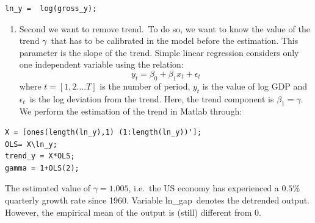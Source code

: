 \documentclass[a4paper,12pt]{article}%
\begin{document}
%

\vspace{1ex}
\begin{verbatim}
ln_y =  log(gross_y);
\end{verbatim}
\vspace{1ex}%


\begin{enumerate}
\item[b] Second we want to remove trend.\ To do so, we want to know the value
of the trend $\gamma$\ that has to be calibrated in the model before the
estimation. This parameter is the slope of the trend. Simple linear regression
considers only one independent variable using the relation:%
\[
y_{t}=\beta_{0}+\beta_{1}x_{t}+\epsilon_{t}%
\]
where $t=[1,2....T]$ is the number of period, $y_{t}$ is the value of log GDP
and $\epsilon_{t}$\ is the log deviation from the trend. Here, the trend
component is $\beta_{1}=\gamma$. We perform the estimation of the trend in
Matlab through:
\end{enumerate}

%

\vspace{1ex}
\begin{verbatim}
X = [ones(length(ln_y),1) (1:length(ln_y))'];
OLS= X\ln_y;
trend_y = X*OLS;
gamma = 1+OLS(2);
\end{verbatim}
\vspace{1ex}%


The estimated value of $\gamma=1.005$, i.e.\ the US economy has experienced a
$0.5\%$ quarterly growth rate since 1960. Variable \textsf{ln\_gap}\ denotes
the detrended output. However, the empirical mean of the output is (still)
different from 0.
\end{document}
